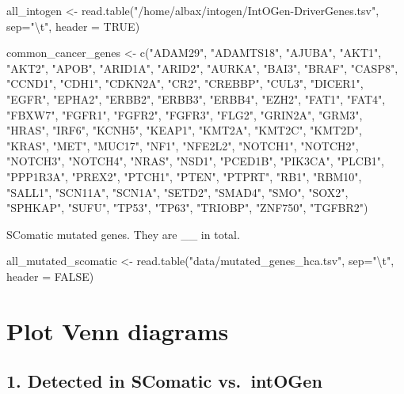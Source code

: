 \documentclass[
  letterpaper,
  DIV=11,
  numbers=noendperiod]{scrreprt}
\newenvironment{Shaded}{\begin{snugshade}}{\end{snugshade}}
\newcommand{\NormalTok}[1]{\textcolor[rgb]{0.00,0.23,0.31}{#1}}
\begin{document}
\begin{Shaded}
\begin{Highlighting}[]
\NormalTok{all\_intogen \textless{}{-} read.table("/home/albax/intogen/IntOGen{-}DriverGenes.tsv", sep="\textbackslash{}t", header = TRUE)}


\NormalTok{common\_cancer\_genes \textless{}{-} c("ADAM29", "ADAMTS18", "AJUBA", "AKT1", "AKT2", "APOB", "ARID1A", "ARID2", "AURKA", "BAI3", "BRAF", "CASP8", "CCND1", "CDH1", "CDKN2A", "CR2", "CREBBP", "CUL3", "DICER1", "EGFR", "EPHA2", "ERBB2", "ERBB3", "ERBB4", "EZH2", "FAT1", "FAT4", "FBXW7", "FGFR1", "FGFR2", "FGFR3", "FLG2", "GRIN2A", "GRM3", "HRAS", "IRF6", "KCNH5", "KEAP1", "KMT2A", "KMT2C", "KMT2D", "KRAS", "MET", "MUC17", "NF1", "NFE2L2", "NOTCH1", "NOTCH2", "NOTCH3", "NOTCH4", "NRAS", "NSD1", "PCED1B", "PIK3CA", "PLCB1", "PPP1R3A", "PREX2", "PTCH1", "PTEN", "PTPRT", "RB1", "RBM10", "SALL1", "SCN11A", "SCN1A", "SETD2", "SMAD4", "SMO", "SOX2", "SPHKAP", "SUFU", "TP53", "TP63", "TRIOBP", "ZNF750", "TGFBR2")}
\end{Highlighting}
\end{Shaded}

SComatic mutated genes. They are \_\_ in total.

\begin{Shaded}
\begin{Highlighting}[]
\NormalTok{all\_mutated\_scomatic \textless{}{-} read.table("data/mutated\_genes\_hca.tsv", sep="\textbackslash{}t", header = FALSE)}
\end{Highlighting}
\end{Shaded}

\chapter{Plot Venn diagrams}\label{plot-venn-diagrams}

\section{1. Detected in SComatic
vs.~intOGen}\label{detected-in-scomatic-vs.-intogen}

\begin{Shaded}
\end{Shaded}
\end{document}
